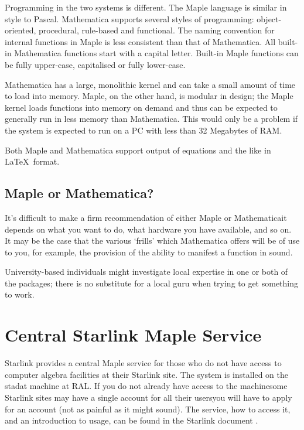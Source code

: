 Programming in the two systems is different.  The Maple language is
similar in style to Pascal.
Mathematica supports several styles of programming:
object-oriented, procedural, rule-based and functional.
The naming convention for internal functions in Maple is less consistent
than that of Mathematica.
All built-in Mathematica functions start with a capital letter.
Built-in Maple functions can be fully upper-case, capitalised or fully
lower-case.

Mathematica has a large, monolithic kernel and can take a small amount of
time to load into memory.
Maple, on the other hand, is modular in design;
the Maple kernel loads functions into memory on demand and thus can be
expected to generally run in less memory than Mathematica.  This would
only be a problem if the system is expected to run on a PC with less than
32 Megabytes of RAM\@.

Both Maple and Mathematica support output of equations and the like
in \LaTeX\ format.

\subsection{Maple or Mathematica?}

It's difficult to make a firm recommendation of either Maple or
Mathematica\sgspec{---}{ - }it depends on what you want to do, what
hardware you have available, and so on.  It may be the case that the
various `frills' which Mathematica offers will be of use to you,
for example, the provision of the ability to manifest a function
in sound.

University-based individuals might investigate local expertise in one or
both of the packages; there is no substitute for a local guru when trying
to get something to work.


\section{\label{se_starlink_maple}Central Starlink
         Maple Service}

Starlink provides a central Maple service for those who do not have access
to computer algebra facilities at their Starlink site.
The system is installed on the stadat machine at RAL.
If you do not already have access to the machine\sgspec{---}{ - }some
Starlink sites may have a single account for all their
users\sgspec{---}{ - }you will have to apply for an account (not as painful
as it might sound).
The service, how to access it, and an introduction to usage, can be found in
the Starlink document \@.


